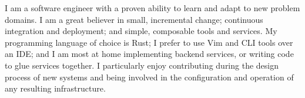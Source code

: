 \documentclass[9pt]{developercv} %
\begin{document}
\vspace{0.5cm}



\begin{minipage}[t]{0.5\textwidth}
	\vspace{-\baselineskip} %
	

	I am a software engineer with a proven ability to learn and adapt to new problem domains.
	I am a great believer in small, incremental change; continuous integration and deployment; and simple, composable tools and services.
	My programming language of choice is Rust; I prefer to use Vim and CLI tools over an IDE; and I am most at home implementing backend services, or writing code to glue services together.
	I particularly enjoy contributing during the design process of new systems and being involved in the configuration and operation of any resulting infrastructure.
\end{minipage}
\hfill %
\begin{minipage}[t]{0.45\textwidth}
	\vspace{-\baselineskip} %
	\begin{barchart}{5.5}
	\end{barchart}
\end{minipage}



\end{document}
